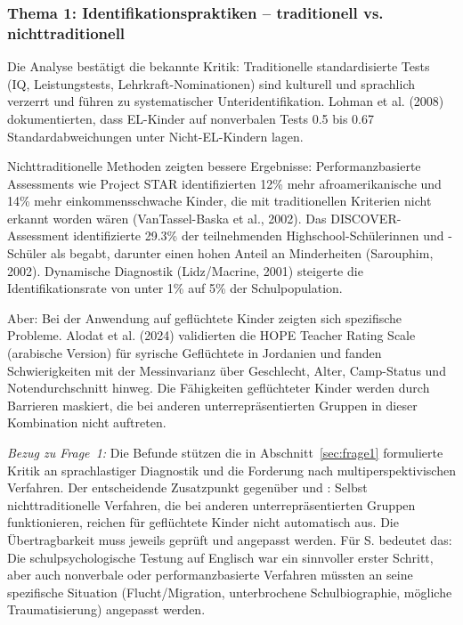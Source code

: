 \documentclass[ngerman, a4paper]{article}
\begin{document}
\subsubsection*{Thema 1: Identifikationspraktiken -- traditionell vs.
  nichttraditionell}

Die Analyse bestätigt die bekannte Kritik: Traditionelle standardisierte
Tests (IQ, Leistungstests, Lehrkraft-Nominationen) sind kulturell und
sprachlich verzerrt und führen zu systematischer Unteridentifikation.
Lohman et al. (2008) dokumentierten, dass EL-Kinder auf nonverbalen Tests
0.5 bis 0.67 Standardabweichungen unter Nicht-EL-Kindern lagen.

Nichttraditionelle Methoden zeigten bessere Ergebnisse: Performanzbasierte
Assessments wie Project STAR identifizierten 12\% mehr afroamerikanische
und 14\% mehr einkommensschwache Kinder, die mit traditionellen Kriterien
nicht erkannt worden wären (VanTassel-Baska et al., 2002). Das
DISCOVER-Assessment identifizierte 29.3\% der teilnehmenden
Highschool-Schülerinnen und -Schüler als begabt, darunter einen hohen
Anteil an Minderheiten (Sarouphim, 2002). Dynamische Diagnostik
(Lidz/Macrine, 2001) steigerte die Identifikationsrate von unter 1\% auf
5\% der Schulpopulation.

Aber: Bei der Anwendung auf geflüchtete Kinder zeigten sich spezifische
Probleme. Alodat et al. (2024) validierten die HOPE Teacher Rating Scale
(arabische Version) für syrische Geflüchtete in Jordanien und fanden
Schwierigkeiten mit der Messinvarianz über Geschlecht, Alter, Camp-Status
und Notendurchschnitt hinweg. Die Fähigkeiten geflüchteter Kinder werden
durch Barrieren maskiert, die bei anderen unterrepräsentierten Gruppen in
dieser Kombination nicht auftreten.

\textit{Bezug zu Frage~1:} Die Befunde stützen die in
Abschnitt~\ref{sec:frage1} formulierte Kritik an sprachlastiger Diagnostik
und die Forderung nach multiperspektivischen Verfahren. Der entscheidende
Zusatzpunkt gegenüber \textcite{mun2020identifying} und
\textcite{gubbins2020promising}: Selbst nichttraditionelle Verfahren, die
bei anderen unterrepräsentierten Gruppen funktionieren, reichen für
geflüchtete Kinder nicht automatisch aus. Die Übertragbarkeit muss jeweils
geprüft und angepasst werden. Für S. bedeutet das: Die schulpsychologische
Testung auf Englisch war ein sinnvoller erster Schritt, aber auch
nonverbale oder performanzbasierte Verfahren müssten an seine spezifische
Situation (Flucht/Migration, unterbrochene Schulbiographie, mögliche
Traumatisierung) angepasst werden.
\end{document}
